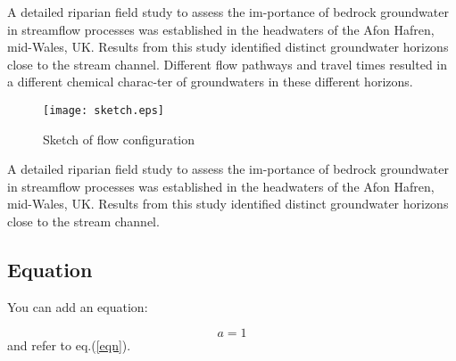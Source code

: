 \documentclass[12pt,a4paper,twocolumn,fleqn]{narms}
\begin{document}
A detailed riparian field study to assess the im-portance of
bedrock groundwater in streamflow processes was established in the
headwaters of the Afon Hafren, mid-Wales, UK.  Results from this
study identified distinct groundwater horizons close to the stream
channel.  Different flow pathways and travel times resulted in a
different chemical charac-ter of groundwaters in these different
horizons.


\begin{figure}[h!]
\centerline{
\texttt{[image: sketch.eps]}
} \caption{Sketch of flow configuration} \label{f:sketch1}
\end{figure}


A detailed riparian field study to assess the im-portance of
bedrock groundwater in streamflow processes was established in the
headwaters of the Afon Hafren, mid-Wales, UK.  Results from this
study identified distinct groundwater horizons close to the stream
channel.


\begin{table}
\caption{Margin settings for A4 size paper and letter size paper.}
\end{table}

\subsection{Equation}

You can add an equation:

\begin{equation}\label{eqn}
  a=1
\end{equation}
and refer to eq.(\ref{eqn}).
\end{document}
